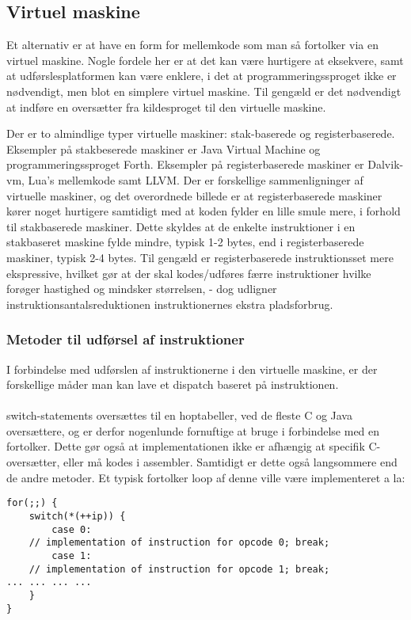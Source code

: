 \documentclass[12pt]{article}
\begin{document}
\subsection{Virtuel maskine}

Et alternativ er at have en form for mellemkode som man så fortolker via en virtuel maskine. Nogle fordele her er at det kan være hurtigere at eksekvere, samt at udførslesplatformen kan være enklere, i det at programmeringssproget ikke er nødvendigt, men blot en simplere virtuel maskine. Til gengæld er det nødvendigt at indføre en oversætter fra kildesproget til den virtuelle maskine.

Der er to almindlige typer virtuelle maskiner: stak-baserede og registerbaserede.
Eksempler på stakbeserede maskiner er Java Virtual Machine og programmeringssproget Forth. Eksempler på registerbaserede maskiner er Dalvik-vm, Lua's mellemkode samt LLVM.
Der er forskellige sammenligninger af virtuelle maskiner\cite{stackregister1,stackregister2}, og det overordnede billede er at registerbaserede maskiner kører noget hurtigere samtidigt med at koden fylder en lille smule mere, i forhold til stakbaserede maskiner. Dette skyldes at de enkelte instruktioner i en stakbaseret maskine fylde mindre, typisk 1-2 bytes, end i registerbaserede maskiner, typisk 2-4 bytes. Til gengæld er registerbaserede instruktionsset mere ekspressive, hvilket gør at der skal kodes/udføres færre instruktioner hvilke forøger hastighed og mindsker størrelsen, - dog udligner instruktions\-antals\-reduktionen instruktionernes ekstra pladsforbrug.

\subsubsection{Metoder til udførsel af instruktioner}
I forbindelse med udførslen af instruktionerne i den virtuelle maskine, er der forskellige måder man kan lave et dispatch baseret på instruktionen.

\paragraph{}
switch-statements oversættes til en hoptabeller, ved de fleste C og Java oversættere, og er derfor nogenlunde fornuftige at bruge i forbindelse med en fortolker. Dette gør også at implementationen ikke er afhængig at specifik C-oversætter, eller må kodes i assembler. Samtidigt er dette også langsommere end de andre metoder. Et typisk fortolker loop af denne ville være implementeret a la:
\begin{verbatim}
for(;;) {
    switch(*(++ip)) {
        case 0:
	// implementation of instruction for opcode 0; break;
        case 1:
	// implementation of instruction for opcode 1; break;
... ... ... ...
    }
}
\end{verbatim}
\end{document}
